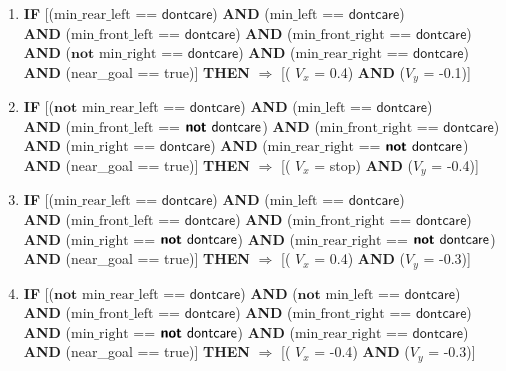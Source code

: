 \begin{enumerate}
	\item \textbf{IF} [($\text{min\_rear\_left}$ == $\textsf{dontcare}$) 
	\textbf{AND} ($\text{min\_left}$ == $\textsf{dontcare}$)\\
	\textbf{AND} ($\text{min\_front\_left}$ == $\textsf{dontcare}$)
	\textbf{AND} ($\text{min\_front\_right}$ == $\textsf{dontcare}$)\\
	\textbf{AND} ($\textbf{not }\text{min\_right}$ == $\textsf{dontcare}$) 
	\textbf{AND} ($\text{min\_rear\_right}$ == $\textsf{dontcare}$)\\
	\textbf{AND} (near\_goal == \textsf{true})]
	\textbf{THEN} $\Rightarrow$ [( $V_x$ = \textsf{0.4}) \textbf{AND} ($V_y$ = \textsf{-0.1})]
	
	\item \textbf{IF} [($\textbf{not }\text{min\_rear\_left}$ == $\textsf{dontcare}$) 
	\textbf{AND} ($\text{min\_left}$ == $\textsf{dontcare}$)\\
	\textbf{AND} ($\text{min\_front\_left}$ == $\textsf{\textbf{not }dontcare}$)
	\textbf{AND} ($\text{min\_front\_right}$ == $\textsf{dontcare}$)\\
	\textbf{AND} ($\text{min\_right}$ == $\textsf{dontcare}$) 
	\textbf{AND} ($\text{min\_rear\_right}$ == $\textsf{\textbf{not }dontcare}$)\\
	\textbf{AND} (near\_goal == \textsf{true})]
	\textbf{THEN} $\Rightarrow$ [( $V_x$ = \textsf{stop}) \textbf{AND} ($V_y$ = \textsf{-0.4})]
	
	\item \textbf{IF} [($\text{min\_rear\_left}$ == $\textsf{dontcare}$) 
	\textbf{AND} ($\text{min\_left}$ == $\textsf{dontcare}$)\\
	\textbf{AND} ($\text{min\_front\_left}$ == $\textsf{dontcare}$)
	\textbf{AND} ($\text{min\_front\_right}$ == $\textsf{dontcare}$)\\
	\textbf{AND} ($\text{min\_right}$ == $\textsf{\textbf{not }dontcare}$) 
	\textbf{AND} ($\text{min\_rear\_right}$ == $\textsf{\textbf{not }dontcare}$)\\
	\textbf{AND} (near\_goal == \textsf{true})]
	\textbf{THEN} $\Rightarrow$ [( $V_x$ = \textsf{0.4}) \textbf{AND} ($V_y$ = \textsf{-0.3})]
	
	\item \textbf{IF} [($\textbf{not }\text{min\_rear\_left}$ == $\textsf{dontcare}$) 
	\textbf{AND} ($\textbf{not }\text{min\_left}$ == $\textsf{dontcare}$)\\
	\textbf{AND} ($\text{min\_front\_left}$ == $\textsf{dontcare}$)
	\textbf{AND} ($\text{min\_front\_right}$ == $\textsf{dontcare}$)\\
	\textbf{AND} ($\text{min\_right}$ == $\textsf{\textbf{not }dontcare}$) 
	\textbf{AND} ($\text{min\_rear\_right}$ == $\textsf{dontcare}$)\\
	\textbf{AND} (near\_goal == \textsf{true})]
	\textbf{THEN} $\Rightarrow$ [( $V_x$ = \textsf{-0.4}) \textbf{AND} ($V_y$ = \textsf{-0.3})]
\end{enumerate}
